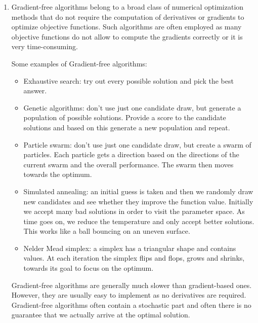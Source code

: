\begin{enumerate}
\item
Gradient-free algorithms belong to a broad class of numerical optimization methods
  that do not require the computation of derivatives or gradients to optimize objective functions.
Such algorithms are often employed as many objective functions do not allow to compute the gradients correctly or it is very time-consuming.
    
Some examples of Gradient-free algorithms:
\begin{itemize}
  \item
  Exhaustive search: try out every possible solution and pick the best answer.
  \item
  Genetic algorithms: don't use just one candidate draw, but generate a population of possible solutions.
  Provide a score to the candidate solutions and based on this generate a new population and repeat.
  \item
  Particle swarm: don't use just one candidate draw, but create a swarm of particles.
  Each particle gets a direction based on the directions of the current swarm and the overall performance.
  The swarm then moves towards the optimum.
  \item
  Simulated annealing: an initial guess is taken and then we randomly draw new candidates
    and see whether they improve the function value.
  Initially we accept many bad solutions in order to visit the parameter space.
  As time goes on, we reduce the temperature and only accept better solutions.
  This works like a ball bouncing on an uneven surface.
  \item
  Nelder Mead simplex: a simplex has a triangular shape and contains values.
  At each iteration the simplex flips and flops, grows and shrinks, towards its goal to focus on the optimum.
\end{itemize}
Gradient-free algorithms are generally much slower than gradient-based ones.
However, they are usually easy to implement as no derivatives are required.
Gradient-free algorithms often contain a stochastic part
  and often there is no guarantee that we actually arrive at the optimal solution.
\end{enumerate}

\item[5./6.]
